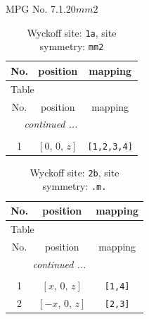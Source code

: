 \documentclass[fleqn,8pt]{jsarticle}
\begin{document}
\setcounter{MaxMatrixCols}{32}

\renewcommand{\tablename}{Table~}
\renewcommand{\figurename}{Figure~}
\begin{center}
\LARGE
MPG No. 7.1.20\quad$mm2$
\end{center}
\renewcommand{\arraystretch}{1.2}
\begin{longtable}{ccc}
\caption{Wyckoff site: {\tt 1a}, site symmetry: {\tt mm2}}
 \\
 \hline \hline
No. & position & mapping \\ \hline \endfirsthead

\multicolumn{2}{l}{\tablename\ \thetable{}} \\
 \hline \hline
No. & position & mapping \\ \hline \endhead

 \hline \hline
\multicolumn{2}{r}{\footnotesize\it continued ...} \\ \endfoot

 \hline \hline
\multicolumn{2}{r}{} \\ \endlastfoot

1 & $\left[ 0,\, 0,\, z \right]$ & {\tt [1,2,3,4]} \\
\end{longtable}
\renewcommand{\arraystretch}{1.2}
\begin{longtable}{ccc}
\caption{Wyckoff site: {\tt 2b}, site symmetry: {\tt .m.}}
 \\
 \hline \hline
No. & position & mapping \\ \hline \endfirsthead

\multicolumn{2}{l}{\tablename\ \thetable{}} \\
 \hline \hline
No. & position & mapping \\ \hline \endhead

 \hline \hline
\multicolumn{2}{r}{\footnotesize\it continued ...} \\ \endfoot

 \hline \hline
\multicolumn{2}{r}{} \\ \endlastfoot

1 & $\left[ x,\, 0,\, z \right]$ & {\tt [1,4]} \\ \hline
2 & $\left[ - x,\, 0,\, z \right]$ & {\tt [2,3]} \\
\end{longtable}
\renewcommand{\arraystretch}{1.2}
\end{document}
